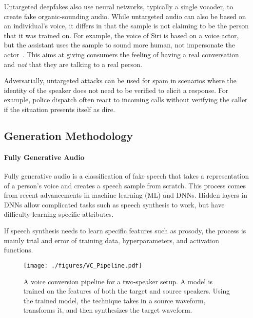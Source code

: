 \documentclass[10pt, journal, anonymous=true]{IEEEtran}
\begin{document}
Untargeted deepfakes also use neural networks, typically a single vocoder, to
create fake organic-sounding audio. 
While untargeted audio can also be based on an individual's voice, 
it differs in that the sample is not
claiming to be the person that it was trained on. For example, the voice of
Siri is based on a voice actor, but the assistant uses the sample to sound
more human, not impersonate the actor~\cite{siri_bennett}.
This aims at giving
consumers the feeling of having a real conversation and \emph{not}
that they are talking to a real person.

Adversarially, untargeted attacks can be used for spam in scenarios where the
identity of the speaker does not need to be verified to elicit a response. For
example, 
police dispatch often react to
incoming calls without verifying the caller if the situation presents
itself as dire. 

\subsection{Generation Methodology} \label{gen_method}

\paragraph{Fully Generative Audio} \label{Generative Audio}

Fully generative audio is a classification of fake speech that takes a
representation of a person's voice and creates a speech sample from scratch.
This process comes from recent advancements in machine learning (ML) and DNNs.  
Hidden layers in DNNs allow complicated tasks
such as speech synthesis to work, but have difficulty 
learning specific attributes. 

If speech
synthesis needs to learn specific features such as prosody, the process is
mainly trial and error of training data,
hyperparameters, and activation functions. 

\begin{figure}
    \begin{center}
        \texttt{[image: ./figures/VC\_Pipeline.pdf]}
        \caption{A voice conversion pipeline for a two-speaker setup. 
        A model is trained on the features of both the target and source speakers.
        Using the trained model, the technique takes in a source waveform, transforms it,
        and then synthesizes the target waveform.} 
        \label{fig:VC_pipeline}
    \end{center}
\end{figure}
\end{document}
